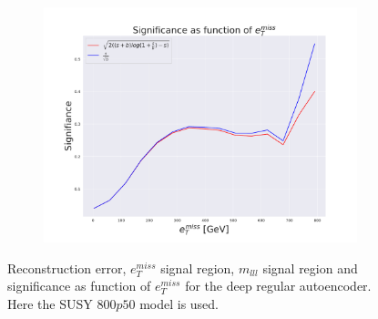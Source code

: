 \begin{figure}[H]
    \begin{subfigure}{.40\textwidth}
        \includegraphics[width=\textwidth]{Figures/AE_testing/big/2lep/significance_etmiss_800p0p050_-1.1125283423037047.pdf}
        \caption{}
        \label{fig:AE_2lep_big_signi_800_2}
    \end{subfigure}
    \hfill      
    \caption[2lep deep network | $800p50$ | AE | 2]{Reconstruction error, $e_T^{miss}$ signal region, $m_{lll}$ signal region and significance as function of 
    $e_T^{miss}$ for the deep regular autoencoder. Here the SUSY $800p50$ model is used.}
    \label{fig:AE_2lep_big_rec_sig_signi_800_2}
\end{figure}

